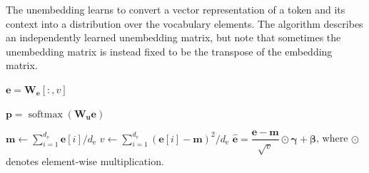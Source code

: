 \documentclass[12pt]{article}
\begin{document}
The unembedding learns to convert a vector
representation of a token and its context into a
distribution over the vocabulary elements.
The algorithm describes an independently learned
unembedding matrix, but note that sometimes
the unembedding matrix is instead fixed to be
the transpose of the embedding matrix.

\setcounter{algocf}{0}
\begin{algorithm}[H]
\caption{Token embedding.}
\label{alg:token_embedding}
\DontPrintSemicolon
    \vspace*{2pt}
    \BlankLine
    \KwReturn $\symbf{e} = \symbf{W}_{\symbf{e}}[:, v]$\;
\end{algorithm}

\setcounter{algocf}{6}
\begin{algorithm}
    \caption{Unembedding.}
    \label{alg:unembedding}
    \DontPrintSemicolon
    \vspace*{2pt}
    \BlankLine
    \KwReturn $\symbf{p} = \operatorname{softmax}(\symbf{W}_{\symbf{u}}\symbf{e})$\;
\end{algorithm}


\setcounter{algocf}{5}
\begin{algorithm}
    \caption{$\hat{\symbf{e}} \leftarrow \mathtt{layer\_norm}(\symbf{e}, \symbf{\gamma}, \symbf{\beta})$}
    \label{alg:layer_norm}
    \DontPrintSemicolon
    \vspace*{4pt}
    \vspace*{4pt}
    $\symbf{m} \leftarrow \sum_{i=1}^{d_{\text{e}}} \symbf{e}[i] / d_{\text{e}}$\;\vspace*{1mm}
    $v \leftarrow \sum_{i=1}^{d_{\text{e}}} (\symbf{e}[i] - \symbf{m})^2 / d_{\mathrm{e}}$\;\vspace*{1mm}
    \Return $\widehat{\symbf{e}} = \dfrac{\symbf{e} - \symbf{m}}{\sqrt{v}} \odot \symbf{\gamma} + \symbf{\beta}$, \hfill where $\odot$ denotes element-wise multiplication.
\end{algorithm}
\end{document}

